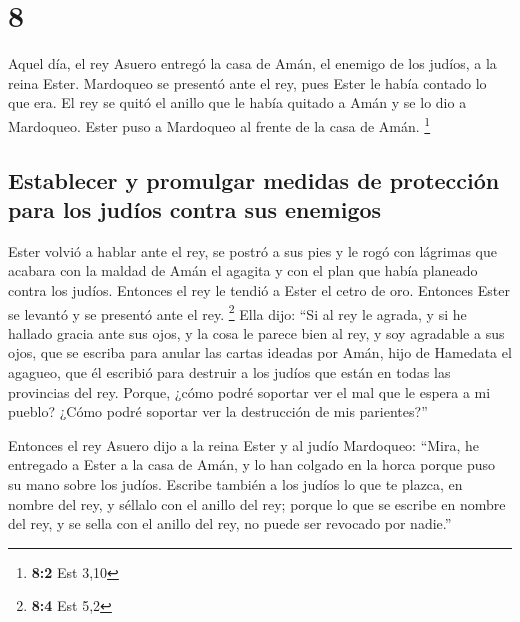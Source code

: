 \hypertarget{section-7}{%
\section{8}\label{section-7}}

 Aquel día, el rey Asuero entregó la casa de Amán, el
enemigo de los judíos, a la reina Ester. Mardoqueo se presentó ante el
rey, pues Ester le había contado lo que era.  El rey se
quitó el anillo que le había quitado a Amán y se lo dio a Mardoqueo.
Ester puso a Mardoqueo al frente de la casa de Amán. \footnote{\textbf{8:2}
  Est 3,10}

\hypertarget{establecer-y-promulgar-medidas-de-protecciuxf3n-para-los-juduxedos-contra-sus-enemigos}{%
\subsection{Establecer y promulgar medidas de protección para los judíos
contra sus
enemigos}\label{establecer-y-promulgar-medidas-de-protecciuxf3n-para-los-juduxedos-contra-sus-enemigos}}

 Ester volvió a hablar ante el rey, se postró a sus pies y
le rogó con lágrimas que acabara con la maldad de Amán el agagita y con
el plan que había planeado contra los judíos.  Entonces el
rey le tendió a Ester el cetro de oro. Entonces Ester se levantó y se
presentó ante el rey. \footnote{\textbf{8:4} Est 5,2} 
Ella dijo: ``Si al rey le agrada, y si he hallado gracia ante sus ojos,
y la cosa le parece bien al rey, y soy agradable a sus ojos, que se
escriba para anular las cartas ideadas por Amán, hijo de Hamedata el
agagueo, que él escribió para destruir a los judíos que están en todas
las provincias del rey.  Porque, ¿cómo podré soportar ver
el mal que le espera a mi pueblo? ¿Cómo podré soportar ver la
destrucción de mis parientes?''

 Entonces el rey Asuero dijo a la reina Ester y al judío
Mardoqueo: ``Mira, he entregado a Ester a la casa de Amán, y lo han
colgado en la horca porque puso su mano sobre los judíos. 
Escribe también a los judíos lo que te plazca, en nombre del rey, y
séllalo con el anillo del rey; porque lo que se escribe en nombre del
rey, y se sella con el anillo del rey, no puede ser revocado por
nadie.''


